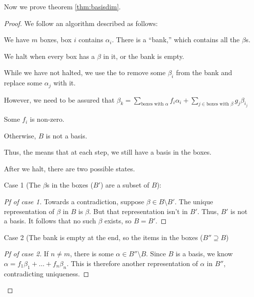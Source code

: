 \documentclass[notes.tex]{subfiles}
\begin{document}
Now we prove theorem \ref{thm:basisdim}.

\begin{proof}
	We follow an algorithm described as follows:

	We have $m$ boxes, box $i$ contains $\alpha_i$. There is a ``bank,'' which contains all the $\beta$s.

	We halt when every box has a $\beta$ in it, or the bank is empty.

	While we have not halted, we use the  to remove some $\beta_i$ from the bank and replace some $\alpha_j$ with it. 

	
	However, we need to be assured that $\beta_k = \sum_{\text{boxes with } \alpha}f_i \alpha_i + \sum_{j\in \text{boxes with }\beta}g_j \beta_{i_j}$
	\begin{claim}
		Some $f_i$ is non-zero.

		Otherwise, $B$ is not a basis.
	\end{claim}
	Thus, the  means that at each step, we still have a basis in the boxes.

	After we halt, there are two possible states.

	Case 1 (The $\beta$s in the boxes ($B'$) are a subset of $B$):
	\begin{proof}[Pf of case 1]
		Towards a contradiction, suppose $\beta\in B\setminus B'$.
		The unique representation of $\beta$ in $B$ is $\beta$. But that representation isn't in $B'$. Thus, $B'$ is not a basis. It follows that no such $\beta$ exists, so $B = B'$.
	\end{proof}

	Case 2 (The bank is empty at the end, so the items in the boxes ($B''\supseteq B$)
	\begin{proof}[Pf of case 2]
		If $n\ne m$, there is some $\alpha\in B''\setminus B$. Since $B$ is a basis, we know $\alpha = f_1 \beta_1 + \ldots + f_n \beta_n$. This is therefore another representation of $\alpha$ in $B''$, contradicting uniqueness.
	\end{proof}


\end{proof}
\end{document}

